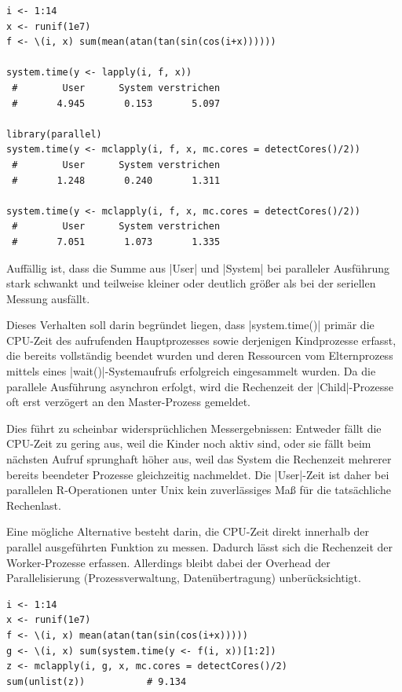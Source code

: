 \documentclass[10pt,twocolumn]{scrartcl}
\renewcommand{\lstinline}{\mycoloredinline}
\begin{document}
\begin{lstlisting}
i <- 1:14
x <- runif(1e7)
f <- \(i, x) sum(mean(atan(tan(sin(cos(i+x))))))

system.time(y <- lapply(i, f, x))
 #        User      System verstrichen 
 #       4.945       0.153       5.097 

library(parallel)
system.time(y <- mclapply(i, f, x, mc.cores = detectCores()/2))
 #        User      System verstrichen
 #       1.248       0.240       1.311

system.time(y <- mclapply(i, f, x, mc.cores = detectCores()/2))
 #        User      System verstrichen 
 #       7.051       1.073       1.335 
\end{lstlisting}

Auffällig ist, dass die Summe aus \lstinline|User| und \lstinline|System| bei paralleler Ausführung stark schwankt und teilweise kleiner oder deutlich größer als bei der seriellen Messung ausfällt.

Dieses Verhalten soll darin begründet liegen, dass \lstinline|system.time()| primär die CPU-Zeit des aufrufenden Hauptprozesses sowie derjenigen Kindprozesse erfasst, die bereits vollständig beendet wurden und deren Ressourcen vom Elternprozess mittels eines \lstinline|wait()|-Systemaufrufs erfolgreich eingesammelt wurden. Da die parallele Ausführung asynchron erfolgt, wird die Rechenzeit der \lstinline|Child|-Prozesse oft erst verzögert an den Master-Prozess gemeldet.

Dies führt zu scheinbar widersprüchlichen Messergebnissen: Entweder fällt die CPU-Zeit zu gering aus, weil die Kinder noch aktiv sind, oder sie fällt beim nächsten Aufruf sprunghaft höher aus, weil das System die Rechenzeit mehrerer bereits beendeter Prozesse gleichzeitig nachmeldet. Die \lstinline|User|-Zeit ist daher bei parallelen R-Operationen unter Unix kein zuverlässiges Maß für die tatsächliche Rechenlast.

Eine mögliche Alternative besteht darin, die CPU-Zeit direkt innerhalb der parallel ausgeführten Funktion zu messen. Dadurch lässt sich die Rechenzeit der Worker-Prozesse erfassen. Allerdings bleibt dabei der Overhead der Parallelisierung (Prozessverwaltung, Datenübertragung) unberücksichtigt.

\begin{lstlisting}
i <- 1:14
x <- runif(1e7)
f <- \(i, x) mean(atan(tan(sin(cos(i+x)))))
g <- \(i, x) sum(system.time(y <- f(i, x))[1:2])
z <- mclapply(i, g, x, mc.cores = detectCores()/2)
sum(unlist(z))           # 9.134
\end{lstlisting}
\end{document}
